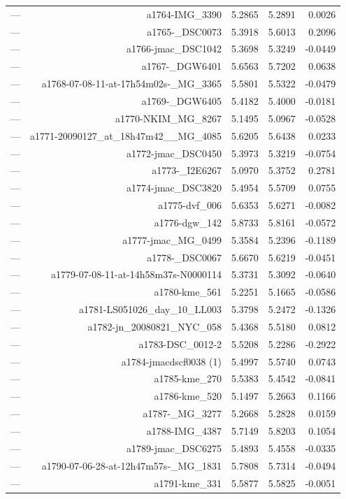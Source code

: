 \begin{table}[htbp]
\begin{tabular}{lrrrr}
— & a1764-IMG_3390 & 5.2865 & 5.2891 & 0.0026 \\
— & a1765-_DSC0073 & 5.3918 & 5.6013 & 0.2096 \\
— & a1766-jmac_DSC1042 & 5.3698 & 5.3249 & -0.0449 \\
— & a1767-_DGW6401 & 5.6563 & 5.7202 & 0.0638 \\
— & a1768-07-08-11-at-17h54m02s-_MG_3365 & 5.5801 & 5.5322 & -0.0479 \\
— & a1769-_DGW6405 & 5.4182 & 5.4000 & -0.0181 \\
— & a1770-NKIM_MG_8267 & 5.1495 & 5.0967 & -0.0528 \\
— & a1771-20090127_at_18h47m42__MG_4085 & 5.6205 & 5.6438 & 0.0233 \\
— & a1772-jmac_DSC0450 & 5.3973 & 5.3219 & -0.0754 \\
— & a1773-_I2E6267 & 5.0970 & 5.3752 & 0.2781 \\
— & a1774-jmac_DSC3820 & 5.4954 & 5.5709 & 0.0755 \\
— & a1775-dvf_006 & 5.6353 & 5.6271 & -0.0082 \\
— & a1776-dgw_142 & 5.8733 & 5.8161 & -0.0572 \\
— & a1777-jmac_MG_0499 & 5.3584 & 5.2396 & -0.1189 \\
— & a1778-_DSC0067 & 5.6670 & 5.6219 & -0.0451 \\
— & a1779-07-08-11-at-14h58m37s-N0000114 & 5.3731 & 5.3092 & -0.0640 \\
— & a1780-kme_561 & 5.2251 & 5.1665 & -0.0586 \\
— & a1781-LS051026_day_10_LL003 & 5.3798 & 5.2472 & -0.1326 \\
— & a1782-jn_20080821_NYC_058 & 5.4368 & 5.5180 & 0.0812 \\
— & a1783-DSC_0012-2 & 5.5208 & 5.2286 & -0.2922 \\
— & a1784-jmacdscf0038 (1) & 5.4997 & 5.5740 & 0.0743 \\
— & a1785-kme_270 & 5.5383 & 5.4542 & -0.0841 \\
— & a1786-kme_520 & 5.1497 & 5.2663 & 0.1166 \\
— & a1787-_MG_3277 & 5.2668 & 5.2828 & 0.0159 \\
— & a1788-IMG_4387 & 5.7149 & 5.8203 & 0.1054 \\
— & a1789-jmac_DSC6275 & 5.4893 & 5.4558 & -0.0335 \\
— & a1790-07-06-28-at-12h47m57s-_MG_1831 & 5.7808 & 5.7314 & -0.0494 \\
— & a1791-kme_331 & 5.5877 & 5.5825 & -0.0051 \\

\end{tabular}
\end{table}
